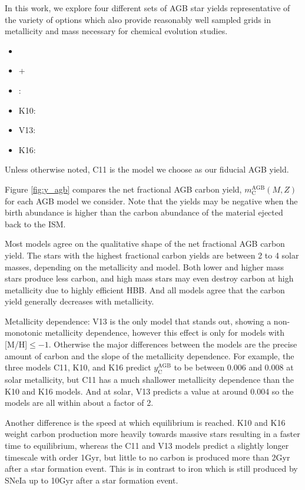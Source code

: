 \documentclass[fleqn,usenatbib]{mnras}
\newcommand{\cristallo}{\citetalias{cristallo+11}+\citetalias{cristallo+15}}
\begin{document}
In this work, we explore four different sets of AGB star yields representative of the variety of options which also provide reasonably well sampled grids in metallicity and mass necessary for chemical evolution studies.
\begin{itemize}
    \item {}
    \item \cristallo
    \item \cite[C11][Hi]{cristallo+11}: \citet{cristallo+11}
    \item K10: \citet{karakas10}
    \item V13: \citet{ventura+13}
    \item K16: \citet{KL16}
\end{itemize}
Unless otherwise noted, C11 is the model we choose as our fiducial AGB yield. 

Figure \ref{fig:y_agb} compares the net fractional AGB carbon yield, $m_\text{C}^\text{AGB}(M, Z)$ for each AGB model we consider. Note that the yields may be negative when the birth abundance is higher than the carbon abundance of the material ejected back to the ISM. 

Most models agree on the qualitative shape of the net fractional AGB carbon yield. The stars with the highest fractional carbon yields are between 2 to 4 solar masses, depending on the metallicity and model. Both lower and higher mass stars produce less carbon, and high mass stars may even destroy carbon at high metallicity due to highly efficient HBB. And all models agree that the carbon yield generally decreases with metallicity. 


Metallicity dependence:
V13 is the only model that stands out, showing a non-monotonic metallicity dependence, however this effect is only for models with [M/H]$\leq -1$. Otherwise the major differences between the models are the precise amount of carbon and the slope of the metallicity dependence. For example, the three models C11, K10, and K16 predict $y_\text{C}^\text{AGB}$ to be between 0.006 and 0.008 at solar metallicity, but C11 has a much shallower metallicity dependence than the K10 and K16 models. And at solar, V13 predicts a value at around 0.004 so the models are all within about a factor of 2. 

Another difference is the speed at which equilibrium is reached. K10 and K16 weight carbon production more heavily towards massive stars resulting in a faster time to equilibrium, whereas the C11 and V13 models predict a slightly longer timescale with order 1Gyr, but little to no carbon is produced more than 2Gyr after a star formation event. This is in contrast to iron which is still produced by SNeIa up to 10Gyr after a star formation event. 
\end{document}

